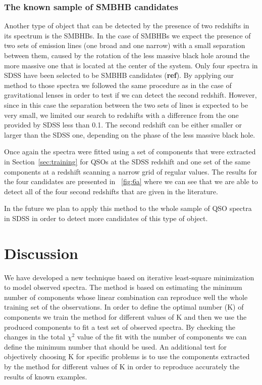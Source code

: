 \documentclass[12pt,preprint]{aastex}
\newcommand{\sectionname}{Section}
\begin{document}
\subsubsection{The known sample of SMBHB candidates}
Another type of object that can be detected by the presence of two
redshifts in its spectrum is the SMBHBs. In the case of SMBHBs we
expect the presence of two sets of emission lines (one broad and one
narrow) with a small separation between them, caused by the rotation
of the less massive black hole around the more massive one that is
located at the center of the system. Only four spectra in SDSS have
been selected to be SMBHB candidates (\textbf{ref}). By applying our
method to those spectra we followed the same procedure as in the case
of gravitational lenses in order to test if we can detect the second
redshift. However, since in this case the separation between the two
sets of lines is expected to be very small, we limited our search to
redshifts with a difference from the one provided by SDSS less than
0.1. The second redshift can be either smaller or larger than the SDSS
one, depending on the phase of the less massive black hole.

Once again the spectra were fitted using a set of components that were
extracted in \sectionname~\ref{sec:training} for QSOs at the SDSS
redshift and one set of the same components at a redshift scanning a
narrow grid of regular values. The results for the four candidates are
presented in \figurename~\ref{fig:6a} where we can see that we are
able to detect all of the four second redshifts that are given in the
literature.

In the future we plan to apply this method to the whole sample of QSO spectra in SDSS in order to detect more candidates of this type of object.

\section{Discussion}\label{sec:discussion}
We have developed a new technique based on iterative least-square minimization to model observed spectra. The method is based on estimating the minimum number of components whose linear combination can reproduce well the whole training set of the observations. In order to define the optimal number (K) of components we train the method for different values of K and then we use the produced components to fit a test set of observed spectra. By checking the changes in the total $\chi^2$ value of the fit with the number of components we can define the minimum number that should be used. An additional test for objectively choosing K for specific problems is to use the components extracted by the method for different values of K in order to reproduce accurately the results of known examples.
\end{document}

